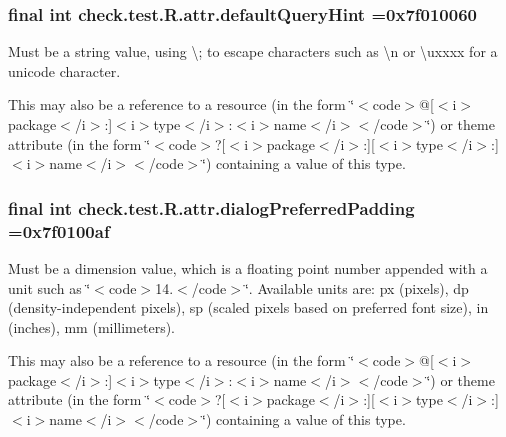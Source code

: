 \subsubsection[{default\+Query\+Hint}]{\setlength{\rightskip}{0pt plus 5cm}final int check.\+test.\+R.\+attr.\+default\+Query\+Hint =0x7f010060\hspace{0.3cm}{\ttfamily [static]}}\label{classcheck_1_1test_1_1_r_1_1attr_a3f57a68c10afd741f6c53c31355e1052}
Must be a string value, using \textquotesingle{}\textbackslash{};\textquotesingle{} to escape characters such as \textquotesingle{}\textbackslash{}n\textquotesingle{} or \textquotesingle{}\textbackslash{}uxxxx\textquotesingle{} for a unicode character. 

This may also be a reference to a resource (in the form \char`\"{}$<$code$>$@\mbox{[}$<$i$>$package$<$/i$>$\+:\mbox{]}$<$i$>$type$<$/i$>$\+:$<$i$>$name$<$/i$>$$<$/code$>$\char`\"{}) or theme attribute (in the form \char`\"{}$<$code$>$?\mbox{[}$<$i$>$package$<$/i$>$\+:\mbox{]}\mbox{[}$<$i$>$type$<$/i$>$\+:\mbox{]}$<$i$>$name$<$/i$>$$<$/code$>$\char`\"{}) containing a value of this type. \hypertarget{classcheck_1_1test_1_1_r_1_1attr_aff223408c80429ebea4398db50b9ff36}{}
\subsubsection[{dialog\+Preferred\+Padding}]{\setlength{\rightskip}{0pt plus 5cm}final int check.\+test.\+R.\+attr.\+dialog\+Preferred\+Padding =0x7f0100af\hspace{0.3cm}{\ttfamily [static]}}\label{classcheck_1_1test_1_1_r_1_1attr_aff223408c80429ebea4398db50b9ff36}
Must be a dimension value, which is a floating point number appended with a unit such as \char`\"{}$<$code$>$14.\+5sp$<$/code$>$\char`\"{}. Available units are\+: px (pixels), dp (density-\/independent pixels), sp (scaled pixels based on preferred font size), in (inches), mm (millimeters). 

This may also be a reference to a resource (in the form \char`\"{}$<$code$>$@\mbox{[}$<$i$>$package$<$/i$>$\+:\mbox{]}$<$i$>$type$<$/i$>$\+:$<$i$>$name$<$/i$>$$<$/code$>$\char`\"{}) or theme attribute (in the form \char`\"{}$<$code$>$?\mbox{[}$<$i$>$package$<$/i$>$\+:\mbox{]}\mbox{[}$<$i$>$type$<$/i$>$\+:\mbox{]}$<$i$>$name$<$/i$>$$<$/code$>$\char`\"{}) containing a value of this type. \hypertarget{classcheck_1_1test_1_1_r_1_1attr_a3ea5dd752e953db06c68789665c1627c}{}
